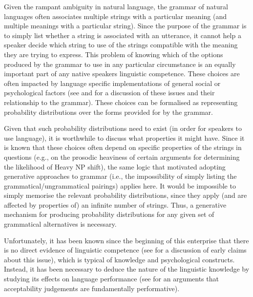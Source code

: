 Given the rampant ambiguity in natural language, the grammar of natural languages often associates multiple strings with a particular meaning (and multiple meanings with a particular string). Since the purpose of the grammar is to simply list whether a string is associated with an utterance, it cannot help a speaker decide which string to use of the strings compatible with the meaning they are trying to express. This problem of knowing which of the options produced by the grammar to use in any particular circumstance is an equally important part of any native speakers linguistic competence. These choices are often impacted by language specific implementations of general social or psychological factors (see \cite{Bresnan.2007,Bresnan.2010,Zeevat.2014} and \cite{Tamminga.2016} for a discussion of these issues and their relationship to the grammar). These choices can be formalised as representing probability distributions over the forms provided for by the grammar.

Given that such probability distributions need to exist (in order for speakers to use language), it is worthwhile to discuss what properties it might have. Since it is known that these choices often depend on specific properties of the strings in questions (e.g., on the prosodic heaviness of certain arguments for determining the likelihood of Heavy NP shift), the same logic that motivated adopting generative approaches to grammar (i.e., the impossibility of simply listing the grammatical/ungrammatical pairings) applies here. It would be impossible to simply memorise the relevant probability distributions, since they apply (and are affected by properties of) an infinite number of strings. Thus, a generative mechanism for producing probability distributions for any given set of grammatical alternatives is necessary.

Unfortunately, it has been known since the beginning of this enterprise that there is no direct evidence of linguistic competence (see \cite{Schutze.1996} for a discussion of early claims about this issue), which is typical of knowledge and psychological constructs. Instead, it has been necessary to deduce the nature of the linguistic knowledge by studying its effects on language performance (see \citealt{Stroud.2012,Phillips.2013, Phillips.2013b, Phillips.2013c} for an arguments that acceptability judgements are fundamentally performative).

